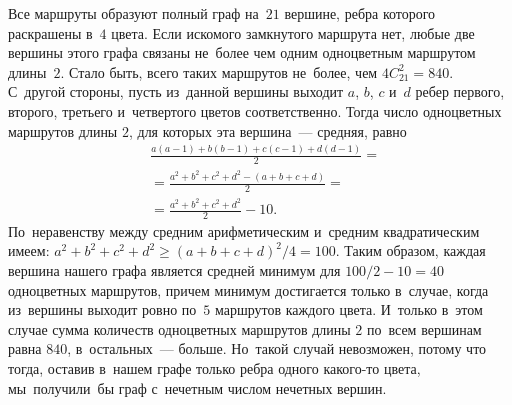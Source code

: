 \ifincludesolutions
Все маршруты образуют полный граф на~$21$ вершине, ребра которого раскрашены
в~$4$ цвета.
Если искомого замкнутого маршрута нет, любые две вершины этого графа связаны
не~более чем одним одноцветным маршрутом длины~$2$.
Стало быть, всего таких маршрутов не~более, чем $4 C_{21}^2 = 840$.
С~другой стороны, пусть из~данной вершины выходит $a$, $b$, $c$ и~$d$ ребер
первого, второго, третьего и~четвертого цветов соответственно.
Тогда число одноцветных маршрутов длины $2$, для которых эта
вершина~--- средняя, равно
\begin{align*}
    &
    \frac{
        a (a - 1) + {} b (b - 1) + c (c - 1) + d (d - 1)
    }{2}
=\\&{}=
    \frac{a^2 + b^2 + c^2 + d^2 - (a + b + c + d)}{2}
=\\&{}=
    \frac{a^2 + b^2 + c^2 + d^2}{2} - 10
.\end{align*}
По~неравенству между средним арифметическим и~средним квадратическим имеем:
\(
    a^2 + b^2 + c^2 + d^2
\geq
    (a + b + c + d)^2 / 4
=
    100
\).
Таким образом, каждая вершина нашего графа является средней минимум для
$100 / 2 - 10 = 40$ одноцветных маршрутов, причем минимум достигается только
в~случае, когда из~вершины выходит ровно по~$5$ маршрутов каждого цвета.
И~только в~этом случае сумма количеств одноцветных маршрутов длины $2$ по~всем
вершинам равна $840$, в~остальных~--- больше.
Но~такой случай невозможен, потому что тогда, оставив в~нашем графе только
ребра одного какого-то цвета, мы~получили~бы граф с~нечетным числом нечетных
вершин.
\fi %

\endgroup %

